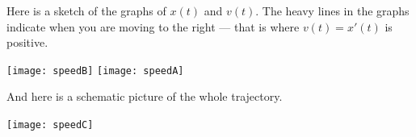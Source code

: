 \begin{eg}
\begin{itemize}
\end{itemize}
Here is a sketch of the graphs of $x(t)$ and $v(t)$. The heavy lines in the graphs
indicate when you are moving to the right --- that is where $v(t)=x'(t)$ is positive.

\begin{efig}
\begin{center}
   \texttt{[image: speedB]}
   \texttt{[image: speedA]}
\end{center}
\end{efig}

And here is a schematic picture of the whole trajectory.

\begin{efig}
\begin{center}
   \texttt{[image: speedC]}
\end{center}
\end{efig}

\end{eg}

